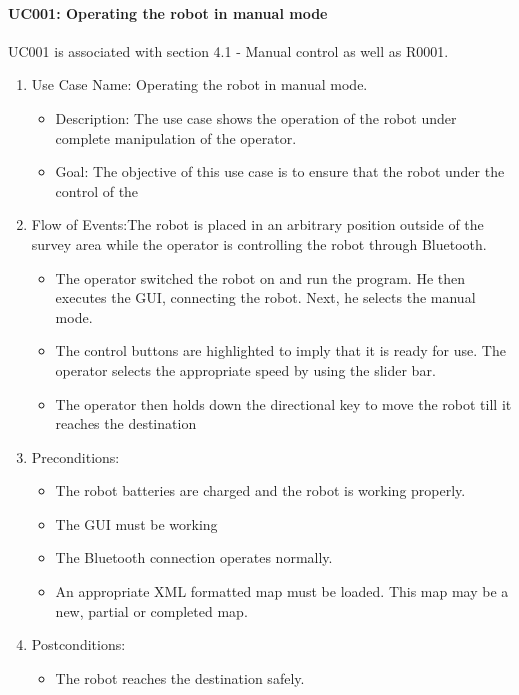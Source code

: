 \documentclass[11pt, a4paper]{report}
\begin{document}
\paragraph{UC001: Operating the robot in manual mode}
UC001 is associated with section 4.1 - Manual control as well as R0001.
\begin{enumerate}
	\item Use Case Name: Operating the robot in manual mode.
	\begin{itemize}	
		\item Description: The use case shows the operation of the robot under complete manipulation of the operator.
		\item Goal: The objective of this use case is to ensure that the robot under the control of the
	\end{itemize}
	\item Flow of Events:The robot is placed in an arbitrary position outside of the survey area while
	the operator is controlling the robot through Bluetooth.
	\begin{itemize}
		\item The operator switched the robot on and run the program. He then
	executes the GUI, connecting the robot. Next, he selects the manual mode.
		\item The control buttons are highlighted to imply that it is ready for use.
	The operator selects the appropriate speed by using the slider bar.
		\item The operator then holds down the directional key to move the robot till it reaches the destination		
	\end{itemize}
	\item Preconditions:
	\begin{itemize}
		\item	The robot batteries are charged and the robot is working properly.
		\item	The GUI must be working
		\item	The Bluetooth connection operates normally.
		\item	An appropriate XML formatted map must be loaded. This map may be a new, partial or
				completed map.
	\end{itemize}
	\item	Postconditions:
	\begin{itemize}
		\item The robot reaches the destination safely.
	\end{itemize}
\end{enumerate}
\end{document}
